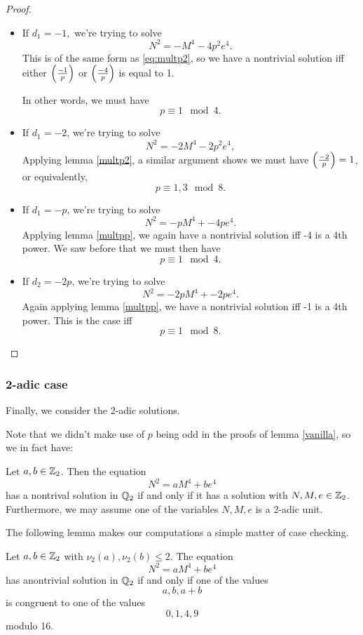 \documentclass[12pt, a4paper]{amsart}
\begin{document}
\begin{proof}
\begin{itemize}
  \item If $d_1 = -1,$ we're trying to solve
    \[N^2 = -M^4 - 4p^2e^4.\]
    This is of the same form as \autoref{eq:multp2}, so we have a nontrivial
    solution iff either $\left(\frac{-1}{p}\right)$ or $\left(\frac{-4}{p}\right)$ is
    equal to 1.

    In other words, we must have
    \[p \equiv 1 \mod{4}.\]


  \item If $d_1 = -2$, we're trying to solve
    \[N^2 = -2M^4 - 2p^2e^4,\]
    Applying lemma \ref{multp2}, a similar argument shows
    we must have $\left(\frac{-2}{p}\right)=1$,
    or equivalently,
    \[p \equiv 1,3 \mod{8}.\]

  \item If $d_1 = -p$, we're trying to solve
    \[N^2 = -pM^4 + -4pe^4.\]
    Applying lemma \ref{multpp}, we again have a nontrivial solution
    iff -4 is a 4th power. We saw before that we must then have
    \[p \equiv 1 \mod{4}.\]

  \item If $d_2 = -2p$, we're trying to solve
    \[N^2 = -2pM^4 + -2pe^4.\]
    Again applying lemma \ref{multpp}, we have a nontrivial solution
    iff -1 is a 4th power. This is the case iff
    \[p \equiv 1 \mod{8}.\]
    
  \end{itemize} \qedhere
\end{proof}

\subsubsection{2-adic case}

Finally, we consider the 2-adic solutions.

Note that we didn't make use of $p$ being odd in the proofs of lemma
\ref{vanilla}, so we in fact have:

\begin{lemma}
  Let $a, b \in {\mathbb Z}_2$. Then the equation
  \[N^2 = aM^4 + be^4\]
  has a nontrival solution in ${\mathbb Q}_2$ if and only if it has a solution
  with $N,M,e \in {\mathbb Z}_2$. Furthermore, we may assume one of the variables
  $N,M,e$ is a 2-adic unit.
\end{lemma}

The following lemma makes our computations a simple matter of case checking.

\begin{lemma} \label{2adic}
  Let $a, b \in {\mathbb Z}_2$ with $\nu_2(a),\nu_2(b) \leq 2$. The equation
  \[N^2 = aM^4 + be^4\]
  has anontrivial solution in ${\mathbb Q}_2$ if and only if one of the values
  \[a, b, a+b\]
  is congruent to one of the values
  \[0,1,4,9\]
  modulo 16.
\end{lemma}
\end{document}
